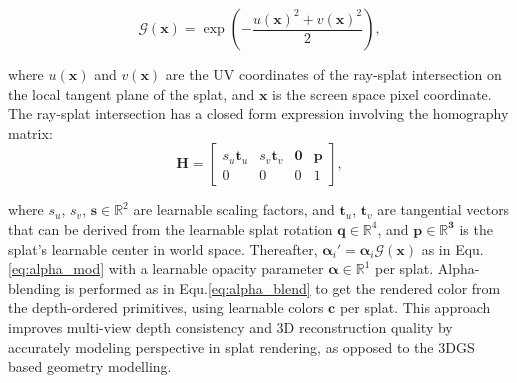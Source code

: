 \begin{equation}
\mathcal{G}(\boldsymbol{x}) = \exp\left(-\frac{u(\boldsymbol{x})^2 + v(\boldsymbol{x})^2}{2}\right),
\end{equation}

where $u(\boldsymbol{x})$ and $v(\boldsymbol{x})$ are the UV coordinates of the ray-splat intersection on the local tangent plane of the splat, and $\boldsymbol{x}$ is the screen space pixel coordinate. The ray-splat intersection has a closed form expression involving the homography matrix:
\begin{equation}
\boldsymbol{H} = \begin{bmatrix}
    s_u \boldsymbol{t}_u & s_v \boldsymbol{t}_v & \boldsymbol{0} & \boldsymbol{p} \\
    0 & 0 & 0 & 1
\end{bmatrix},
\end{equation}

where $s_u$, $s_v$, \ie $\boldsymbol{s} \in \mathbb{R}^{2}$ are learnable scaling factors, and $\boldsymbol{t}_u$, $\boldsymbol{t}_v$ are tangential vectors that can be derived from the learnable splat rotation $\boldsymbol{q} \in \mathbb{R}^{4}$, and $\boldsymbol{p \in \mathbb{R}^{3}}$ is the splat's learnable center in world space. Thereafter, $\mathbf{\alpha}_i' = \mathbf{\alpha}_i\mathcal{G}(\boldsymbol{x})$ as in Equ.\ref{eq:alpha_mod} with a learnable opacity parameter $\boldsymbol{\alpha} \in \mathbb{R}^{1}$ per splat. Alpha-blending is performed as in Equ.\ref{eq:alpha_blend} to get the rendered color from the depth-ordered primitives, using learnable colors $\boldsymbol{c}$ per splat. This approach improves multi-view depth consistency and 3D reconstruction quality by accurately modeling perspective in splat rendering, as opposed to the 3DGS based geometry modelling.



